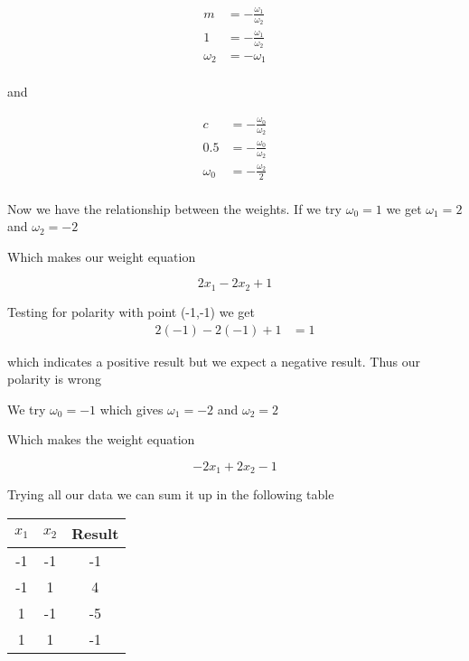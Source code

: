 \documentclass[10pt,a4paper]{article}
\begin{document}
\begin{equation}
\begin{split}
m &= -\frac{\omega_1}{\omega_2} \\
1 &= -\frac{\omega_1}{\omega_2} \\
\omega_2 &= -\omega_1 \\
\end{split}
\end{equation}

and

\begin{equation}
\begin{split}
c &= -\frac{\omega_0}{\omega_2}\\
0.5 &= -\frac{\omega_0}{\omega_2}\\
\omega_0 &= -\frac{\omega_2}{2}\\
\end{split}
\end{equation}

Now we have the relationship between the weights. If we try $\omega_0 = 1$ we get $\omega_1 = 2$ and $\omega_2 = -2$ 

Which makes our weight equation

\begin{equation}
2x_1 - 2x_2 + 1
\end{equation}

Testing for polarity with point (-1,-1) we get
\begin{equation}
\begin{split}
2(-1) -2(-1) + 1 &= 1
\end{split}
\end{equation}

which indicates a positive result but we expect a negative result. Thus our polarity is wrong

We try $\omega_0 = -1$ which gives $\omega_1 = -2$ and $\omega_2 = 2$

Which makes the weight equation

\begin{equation}
-2x_1 + 2x_2 - 1
\end{equation}

Trying all our data we can sum it up in the following table

\begin{tabular}{|c|c|c|}
\hline
$x_1$ & $x_2$ & Result \\
\hline
-1 &-1 & -1\\
-1 & 1 & 4\\
1  &-1 & -5\\
1  & 1 & -1 \\
\hline
\end{tabular}
\end{document}
